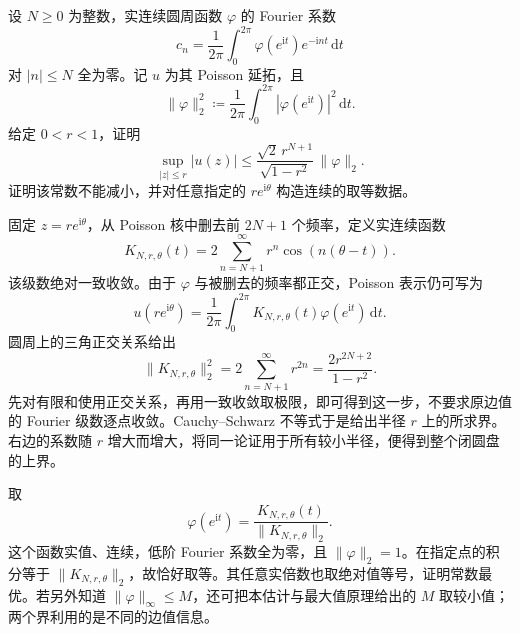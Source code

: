 \begin{exercise}[高频数据的最优平方积分估计]\label{b3:ex:16-draft-02}
设 \(N\ge0\) 为整数，实连续圆周函数 \(\varphi\) 的 Fourier 系数
\[
 c_n=\frac1{2\pi}\int_0^{2\pi}\varphi(e^{\mathrm it})e^{-\mathrm int}\,\mathrm dt
\]
对 \(|n|\le N\) 全为零。记 \(u\) 为其 Poisson 延拓，且
\[
 \|\varphi\|_2^2\coloneqq
 \frac1{2\pi}\int_0^{2\pi}|\varphi(e^{\mathrm it})|^2\,\mathrm dt.
\]
给定 \(0<r<1\)，证明
\[
 \sup_{|z|\le r}|u(z)|
 \le\frac{\sqrt2\,r^{N+1}}{\sqrt{1-r^2}}\,\|\varphi\|_2.
\]
证明该常数不能减小，并对任意指定的 \(re^{\mathrm i\theta}\) 构造连续的取等数据。
\end{exercise}
\begin{solution}
固定 \(z=re^{\mathrm i\theta}\)，从 Poisson 核中删去前 \(2N+1\) 个频率，定义实连续函数
\[
 K_{N,r,\theta}(t)
 =2\sum_{n=N+1}^\infty r^n\cos(n(\theta-t)).
\]
该级数绝对一致收敛。由于 \(\varphi\) 与被删去的频率都正交，Poisson 表示仍可写为
\[
 u(re^{\mathrm i\theta})
 =\frac1{2\pi}\int_0^{2\pi}
           K_{N,r,\theta}(t)\varphi(e^{\mathrm it})\,\mathrm dt.
\]
圆周上的三角正交关系给出
\[
 \|K_{N,r,\theta}\|_2^2
 =2\sum_{n=N+1}^\infty r^{2n}
 =\frac{2r^{2N+2}}{1-r^2}.
\]
先对有限和使用正交关系，再用一致收敛取极限，即可得到这一步，不要求原边值的 Fourier 级数逐点收敛。Cauchy--Schwarz 不等式于是给出半径 \(r\) 上的所求界。右边的系数随 \(r\) 增大而增大，将同一论证用于所有较小半径，便得到整个闭圆盘的上界。

取
\[
 \varphi(e^{\mathrm it})
 =\frac{K_{N,r,\theta}(t)}{\|K_{N,r,\theta}\|_2}.
\]
这个函数实值、连续，低阶 Fourier 系数全为零，且 \(\|\varphi\|_2=1\)。在指定点的积分等于 \(\|K_{N,r,\theta}\|_2\)，故恰好取等。其任意实倍数也取绝对值等号，证明常数最优。若另外知道 \(\|\varphi\|_\infty\le M\)，还可把本估计与最大值原理给出的 \(M\) 取较小值；两个界利用的是不同的边值信息。
\end{solution}

